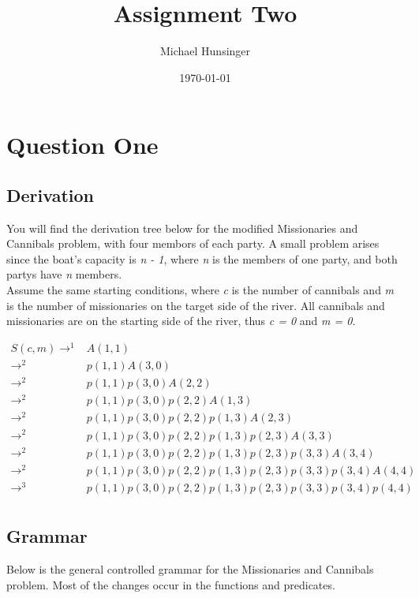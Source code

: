 \documentclass[a4paper]{article}
\author{Michael Hunsinger}
\date{\today}
\title{Assignment Two}
\begin{document}
\maketitle

\section*{Question One}
\label{sec-1}
\subsection*{Derivation}
\label{sec-1-1}
You will find the derivation tree below for the modified Missionaries and
Cannibals problem, with four membors of each party. A small problem arises
since the boat's capacity is \emph{n - 1}, where \emph{n} is the members of one party,
and both partys have \emph{n} members. \\

Assume the same starting conditions, where \emph{c} is the number of cannibals and
\emph{m} is the number of missionaries on the target side of the river. All
cannibals and missionaries are on the starting side of the river, thus \emph{c =
0} and \emph{m = 0}.

\begin{equation}
\begin{split}
S(c, m) \rightarrow^1 & A(1,1) \\
\rightarrow^2 & p(1,1)A(3,0) \\
\rightarrow^2 & p(1,1)p(3,0)A(2,2) \\
\rightarrow^2 & p(1,1)p(3,0)p(2,2)A(1,3) \\
\rightarrow^2 & p(1,1)p(3,0)p(2,2)p(1,3)A(2,3) \\
\rightarrow^2 & p(1,1)p(3,0)p(2,2)p(1,3)p(2,3)A(3,3) \\
\rightarrow^2 & p(1,1)p(3,0)p(2,2)p(1,3)p(2,3)p(3,3)A(3,4) \\
\rightarrow^2 & p(1,1)p(3,0)p(2,2)p(1,3)p(2,3)p(3,3)p(3,4)A(4,4) \\
\rightarrow^3 & p(1,1)p(3,0)p(2,2)p(1,3)p(2,3)p(3,3)p(3,4)p(4,4) \\
\end{split}
\end{equation}

\subsection*{Grammar}
\label{sec-1-2}
Below is the general controlled grammar for the Missionaries and Cannibals
problem. Most of the changes occur in the functions and predicates.
\end{document}
